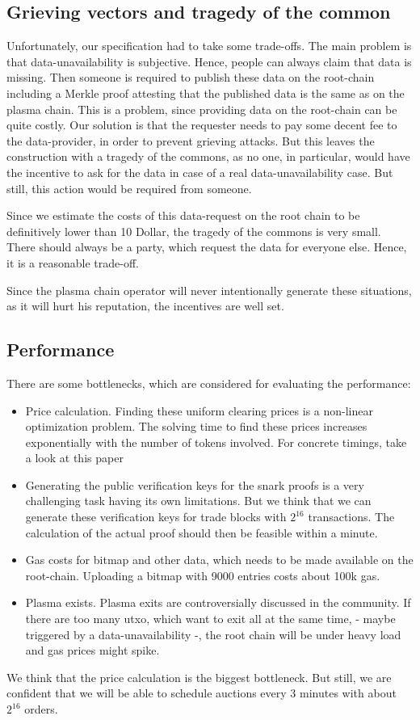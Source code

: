 \documentclass[11pt,parskip=full]{scrartcl}%
\begin{document}
\subsection{Grieving vectors and tragedy of the common}
Unfortunately, our specification had to take some trade-offs. 
The main problem is that data-unavailability is subjective. 
Hence, people can always claim that data is missing. 
Then someone is required to publish these data on the root-chain including a Merkle proof attesting that the published data is the same as on the plasma chain. 
This is a problem, since providing data on the root-chain can be quite costly. 
Our solution is that the requester needs to pay some decent fee to the data-provider, in order to prevent grieving attacks. 
But this leaves the construction with a tragedy of the commons, as no one, in particular, would have the incentive to ask for the data in case of a real data-unavailability case. 
But still, this action would be required from someone. 

Since we estimate the costs of this data-request on the root chain to be definitively lower than 10 Dollar, the tragedy of the commons is very small. 
There should always be a party, which request the data for everyone else. Hence, it is a reasonable trade-off. 

Since the plasma chain operator will never intentionally generate these situations, as it will hurt his reputation, the incentives are well set. 

\subsection{Performance}
There are some bottlenecks, which are considered for evaluating the performance:
\begin{itemize}
\item Price calculation. 
Finding these uniform clearing prices is a non-linear optimization problem. 
The solving time to find these prices increases exponentially with the number of tokens involved. For concrete timings, take a look at this paper \cite{priceOptimization}
\item Generating the public verification keys for the snark proofs is a very challenging task having its own limitations. 
But we think that we can generate these verification keys for trade blocks with $2^{16}$ transactions. 
The calculation of the actual proof should then be feasible within a minute. 
\item Gas costs for bitmap and other data, which needs to be made available on the root-chain. 
Uploading a bitmap with 9000 entries costs about 100k gas. 
\item Plasma exists.
Plasma exits are controversially discussed in the community. 
If there are too many utxo, which want to exit all at the same time, - maybe triggered by a data-unavailability -, the root chain will be under heavy load and gas prices might spike. 
\end{itemize}
We think that the price calculation is the biggest bottleneck. 
But still, we are confident that we will be able to schedule auctions every 3 minutes with about $2^{16}$ orders. 
\end{document}
